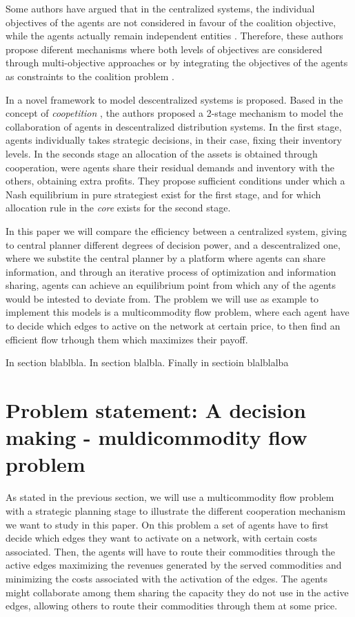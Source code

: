\documentclass[review]{elsarticle}
\begin{document}
Some authors have argued that in the centralized systems, the individual
objectives of the agents are not considered in favour of the coalition
objective, while the agents actually remain independent entities
\cite{DEFRYN2018891}. Therefore, these authors propose diferent mechanisms where
both levels of objectives are considered through multi-objective approaches
\cite{DEFRYN20191} or by integrating the objectives of the agents as constraints
to the coalition problem \cite{VANOVERMEIRE2014125}.

In \cite{ANUPINDI2001} a novel framework to model descentralized systems is
proposed. Based in the concept of \emph{coopetition} \cite{BRANDENBURGER1996},
the authors proposed a 2-stage mechanism to model the collaboration of agents in
descentralized distribution systems. In the first stage, agents individually
takes strategic decisions, in their case, fixing their inventory levels. In the
seconds stage an allocation of the assets is obtained through cooperation, were
agents share their residual demands and inventory with the others, obtaining
extra profits. They propose sufficient conditions under which a Nash equilibrium
in pure strategiest exist for the first stage, and for which allocation rule in
the \emph{core} exists for the second stage.



In this paper we will compare the efficiency between a centralized system,
giving to central planner different degrees of decision power, and a
descentralized one, where we substite the central planner by a platform where
agents can share information, and through an iterative process of optimization
and information sharing, agents can achieve an equilibrium point from which any
of the agents would be intested to deviate from. The problem we
will use as example to implement this models is a multicommodity flow problem,
where each agent have to decide which edges to active on the network at certain
price, to then find an efficient flow trhough them which maximizes their
payoff.

In section blablbla. In section blalbla. Finally in sectioin blalblalba


\section{Problem statement: A decision making - muldicommodity flow problem}

As stated in the previous section, we will use a multicommodity flow problem
with a strategic planning stage to illustrate the different cooperation
mechanism we want to study in this paper. On this problem a set of agents have
to first decide which edges they want to activate on a network, with certain
costs associated. Then, the agents will have to route their commodities through
the active edges maximizing the revenues generated by the served commodities and
minimizing the costs associated with the activation of the edges. The agents
might collaborate among them sharing the capacity they do not use in the active
edges, allowing others to route their commodities through them at some price.
\end{document}
